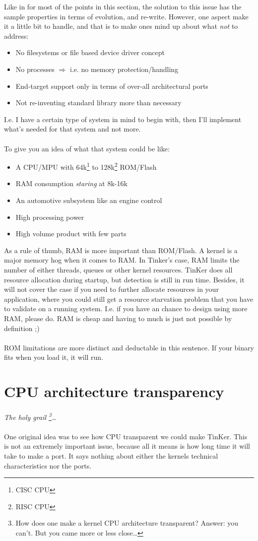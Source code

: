 Like in for most of the points in this section, the solution to this issue has the sample properties in terms of evolution, and re-write. However, one aspect make it a little bit to handle, and that is to make ones mind up about what \textit{not} to address:
\begin{itemize}
	\item No filesystems or file based device driver concept
	\item No processes $\Rightarrow$ i.e. no memory protection/handling
	\item End-target support only in terms of over-all architectural ports
	\item Not re-inventing standard library more than necessary
\end{itemize}
I.e. I have a certain type of system in mind to begin with, then I'll implement what's needed for that system and not more.
\\\\
To give you an idea of what that system could be like:
\begin{itemize}
	\item A CPU/MPU with 64k\footnote{CISC CPU} to 128k\footnote{RISC CPU} ROM/Flash
	\item RAM consumption \textit{staring} at 8k-16k
	\item An automotive subsystem like an engine control
	\item High processing power
	\item High volume product with few parts
\end{itemize}
As a rule of thumb, RAM is more important than ROM/Flash. A kernel is a major memory hog when it comes to RAM. In Tinker's case, RAM limits the number of either threads, queues or other kernel resources. TinKer does all resource allocation during startup, but detection is  still in run time. Besides, it will not cover the case if you need to further allocate resources in your application, where you could still get a resource starvation problem that you have to validate on a running system. I.e. if you have an chance to design using more RAM, please do. RAM is cheap and having to much is just not possible by definition ;)
\\\\
ROM limitations are more distinct and deductable in this sentence. If your binary fits when you load it, it will run.


\chapter{CPU architecture transparency}
\textit{The holy grail \footnote{How does one make a kernel CPU architecture transparent? Answer: you can't. But you came more or less close\ldots}\ldots}\
\\\\
One original idea was to see how CPU transparent we could make TinKer. This is not an extremely important issue, because all it means is how long time it will take to make a port. It says nothing about either the kernels technical characteristics nor the ports.

